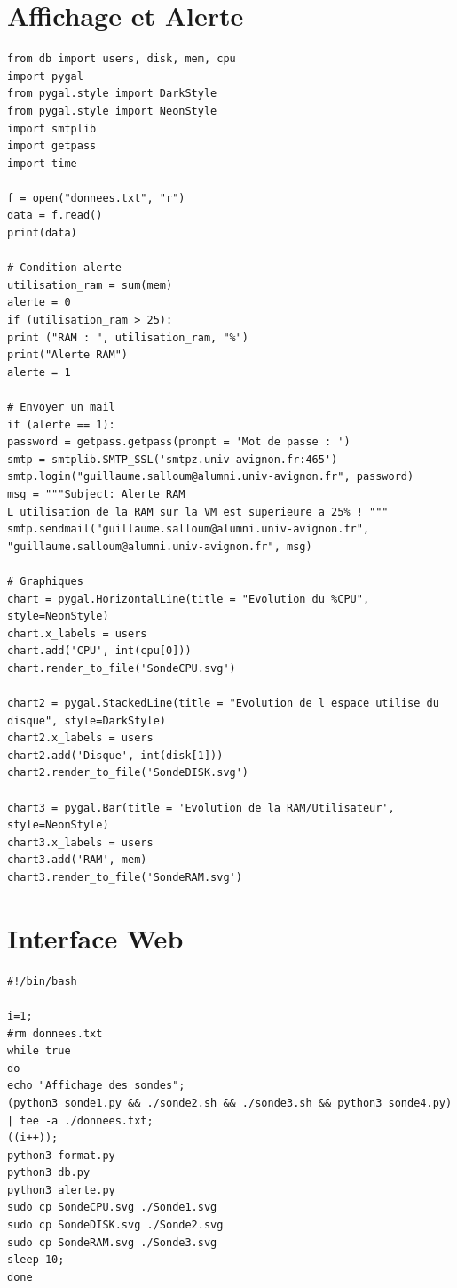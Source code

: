 \documentclass[a4paper, twoside]{report}
\begin{document}
\chapter{Affichage et Alerte}

\begin{lstlisting}[style=python]
from db import users, disk, mem, cpu
import pygal
from pygal.style import DarkStyle
from pygal.style import NeonStyle
import smtplib
import getpass
import time

f = open("donnees.txt", "r")
data = f.read()
print(data)

# Condition alerte
utilisation_ram = sum(mem)
alerte = 0
if (utilisation_ram > 25):
print ("RAM : ", utilisation_ram, "%")
print("Alerte RAM")
alerte = 1

# Envoyer un mail
if (alerte == 1):
password = getpass.getpass(prompt = 'Mot de passe : ')
smtp = smtplib.SMTP_SSL('smtpz.univ-avignon.fr:465')
smtp.login("guillaume.salloum@alumni.univ-avignon.fr", password)
msg = """Subject: Alerte RAM 
L utilisation de la RAM sur la VM est superieure a 25% ! """
smtp.sendmail("guillaume.salloum@alumni.univ-avignon.fr", "guillaume.salloum@alumni.univ-avignon.fr", msg)

# Graphiques
chart = pygal.HorizontalLine(title = "Evolution du %CPU", style=NeonStyle)
chart.x_labels = users
chart.add('CPU', int(cpu[0]))
chart.render_to_file('SondeCPU.svg')

chart2 = pygal.StackedLine(title = "Evolution de l espace utilise du disque", style=DarkStyle)
chart2.x_labels = users
chart2.add('Disque', int(disk[1]))
chart2.render_to_file('SondeDISK.svg')

chart3 = pygal.Bar(title = 'Evolution de la RAM/Utilisateur', style=NeonStyle)
chart3.x_labels = users
chart3.add('RAM', mem)
chart3.render_to_file('SondeRAM.svg')

\end{lstlisting}

\chapter{Interface Web}

\begin{lstlisting}[style=python]
#!/bin/bash

i=1;
#rm donnees.txt
while true
do
echo "Affichage des sondes";
(python3 sonde1.py && ./sonde2.sh && ./sonde3.sh && python3 sonde4.py) | tee -a ./donnees.txt;
((i++));
python3 format.py
python3 db.py
python3 alerte.py
sudo cp SondeCPU.svg ./Sonde1.svg
sudo cp SondeDISK.svg ./Sonde2.svg
sudo cp SondeRAM.svg ./Sonde3.svg
sleep 10;
done

\end{lstlisting}
\end{document}
